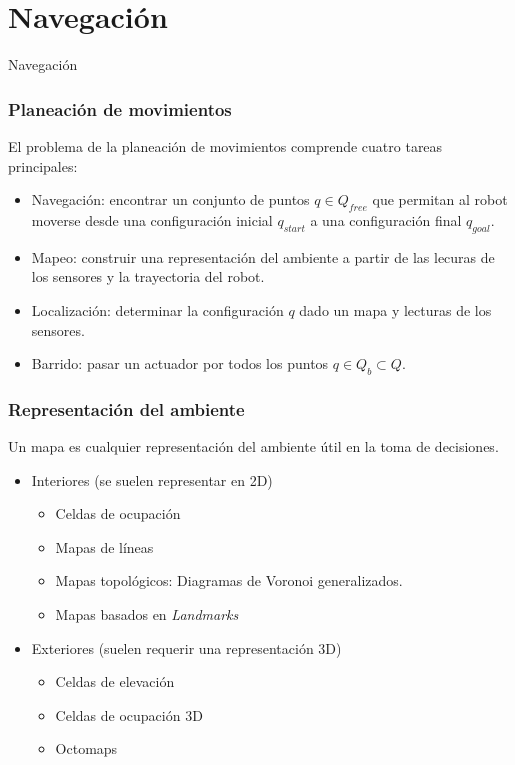 \section[Navegación]{Navegación}

\begin{frame}
  \Huge
  Navegación
\end{frame}

\begin{frame}\frametitle{Planeación de movimientos}
  El problema de la planeación de movimientos comprende cuatro tareas principales:
  \begin{itemize}
  \item Navegación: encontrar un conjunto de puntos $q \in Q_{free}$ que permitan al robot moverse desde una configuración inicial $q_{start}$ a una configuración final $q_{goal}$. 
  \item Mapeo: construir una representación del ambiente a partir de las lecuras de los sensores y la trayectoria del robot. 
  \item Localización: determinar la configuración $q$ dado un mapa y lecturas de los sensores. 
  \item Barrido: pasar un actuador por todos los puntos $q\in Q_b \subset Q$.
  \end{itemize}
\end{frame}

\begin{frame}\frametitle{Representación del ambiente}
  Un mapa es cualquier representación del ambiente útil en la toma de decisiones.
  \begin{itemize}
  \item Interiores (se suelen representar en 2D)
    \begin{itemize}
    \item Celdas de ocupación
    \item Mapas de líneas
    \item Mapas topológicos: Diagramas de Voronoi generalizados. 
    \item Mapas basados en \textit{Landmarks}
    \end{itemize}
  \item Exteriores (suelen requerir una representación 3D)
    \begin{itemize}
    \item Celdas de elevación
    \item Celdas de ocupación 3D
    \item Octomaps
    \end{itemize}
  \end{itemize}
\end{frame}

